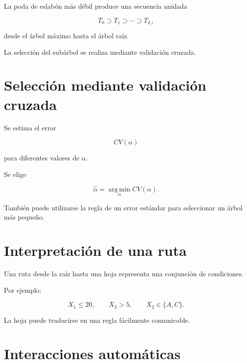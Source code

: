 \documentclass[
  spanish,
  10.5pt,
  letterpaper,
  DIV=11,
  numbers=noendperiod,
  oneside,
  open=any]{scrreprt}
\theoremstyle{definition}
\theoremstyle{definition}
\theoremstyle{plain}
\theoremstyle{remark}
\begin{document}

La poda de eslabón más débil produce una secuencia anidada

\[
T_0\supset T_1\supset\cdots\supset T_L,
\]

desde el árbol máximo hasta el árbol raíz.

La selección del subárbol se realiza mediante validación cruzada.

\section*{Selección mediante validación
cruzada}\label{selecciuxf3n-mediante-validaciuxf3n-cruzada}


Se estima el error

\[
CV(\alpha)
\]

para diferentes valores de \(\alpha\).

Se elige

\[
\widehat{\alpha}
=
\operatorname*{arg\,min}_{\alpha}CV(\alpha).
\]

También puede utilizarse la regla de un error estándar para seleccionar
un árbol más pequeño.

\section*{Interpretación de una
ruta}\label{interpretaciuxf3n-de-una-ruta}


Una ruta desde la raíz hasta una hoja representa una conjunción de
condiciones.

Por ejemplo:

\[
X_1\leq 20,
\qquad
X_3>5,
\qquad
X_2\in\{A,C\}.
\]

La hoja puede traducirse en una regla fácilmente comunicable.

\section*{Interacciones automáticas}\label{interacciones-automuxe1ticas}

\end{document}
